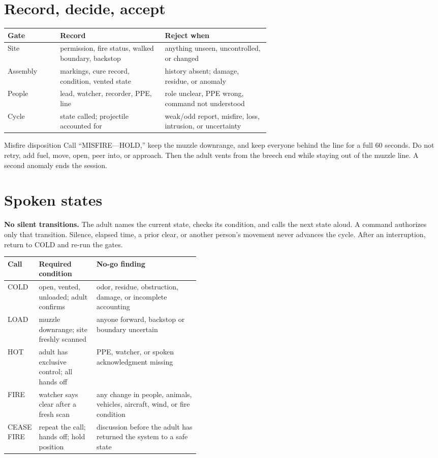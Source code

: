\section{Record, decide, accept}
\begin{tabularx}{\linewidth}{@{}p{0.20\linewidth}p{0.40\linewidth}L@{}}
\toprule
\textbf{Gate} & \textbf{Record} & \textbf{Reject when}\\
\midrule
Site & permission, fire status, walked boundary, backstop & anything unseen,
uncontrolled, or changed\\
Assembly & markings, cure record, condition, vented state & history absent;
damage, residue, or anomaly\\
People & lead, watcher, recorder, PPE, line & role unclear, PPE wrong, command
not understood\\
Cycle & state called; projectile accounted for & weak/odd report, misfire,
loss, intrusion, or uncertainty\\
\bottomrule
\end{tabularx}

\begin{teloshazard}{Misfire disposition}
Call ``MISFIRE---HOLD,'' keep the muzzle downrange, and keep everyone behind
the line for a full 60 seconds. Do not retry, add fuel, move, open, peer into,
or approach. Then the adult vents from the breech end while staying out of the
muzzle line. A second anomaly ends the session.
\end{teloshazard}

\section{Spoken states}
\begin{telosframe}
\textbf{No silent transitions.} The adult names the current state, checks its
condition, and calls the next state aloud. A command authorizes only that
transition. Silence, elapsed time, a prior clear, or another person's movement
never advances the cycle. After an interruption, return to COLD and re-run the
gates.
\end{telosframe}
\begin{tabularx}{\linewidth}{@{}p{0.14\linewidth}p{0.30\linewidth}L@{}}
\toprule
\textbf{Call} & \textbf{Required condition} & \textbf{No-go finding}\\
\midrule
COLD & open, vented, unloaded; adult confirms & odor, residue, obstruction,
damage, or incomplete accounting\\
LOAD & muzzle downrange; site freshly scanned & anyone forward, backstop or
boundary uncertain\\
HOT & adult has exclusive control; all hands off & PPE, watcher, or spoken
acknowledgment missing\\
FIRE & watcher says clear after a fresh scan & any change in people, animals,
vehicles, aircraft, wind, or fire condition\\
CEASE FIRE & repeat the call; hands off; hold position & discussion before the
adult has returned the system to a safe state\\
\bottomrule
\end{tabularx}

